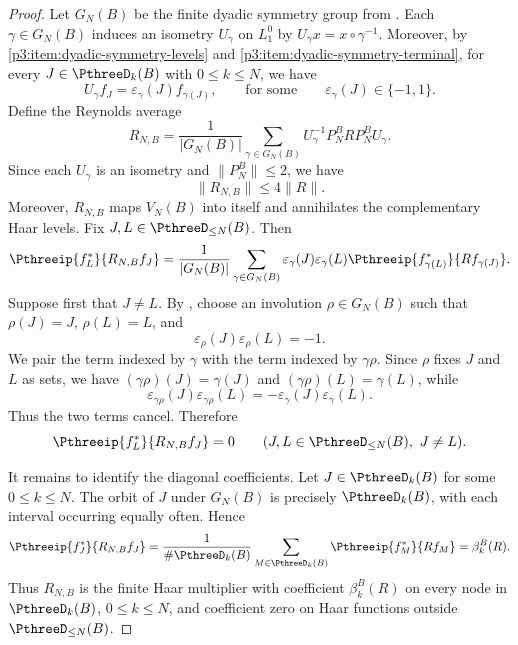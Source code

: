 \documentclass[11pt,reqno]{amsart}
\makeatletter
\theoremstyle{plain}
\theoremstyle{definition}
\newcounter{problempaper}
\newenvironment{problempaperbody}{%
  \setcounter{subsection}{0}%
  \setcounter{subsubsection}{0}%
  \setcounter{paragraph}{0}%
  \renewcommand{\thesubsection}{\arabic{subsection}}%
  \renewcommand{\thesubsubsection}{\thesubsection.\arabic{subsubsection}}%
  \renewcommand{\theparagraph}{\thesubsubsection.\arabic{paragraph}}%
  \let\problem@outersection\section
  \let\problem@outersubsection\subsection
  \let\problem@outersubsubsection\subsubsection
  \let\problem@outerparagraph\paragraph
  \let\section\problem@papersection
  \let\subsection\problem@papersubsection
  \let\subsubsection\problem@papersubsubsection
}{%
  \let\section\problem@outersection
  \let\subsection\problem@outersubsection
  \let\subsubsection\problem@outersubsubsection
  \let\paragraph\problem@outerparagraph
}
\newcommand{\problem@target}[2]{%
  \hypertarget{problem-\theproblempaper-#1-#2}{}%
}
\newcommand{\problem@paperheading}[3]{%
  \par\bigskip
  \problem@target{#1}{#2}%
  \noindent{\large\bfseries #2.\quad #3\par}%
  \nobreak\smallskip
}
\newcommand{\problem@papersubheading}[3]{%
  \par\medskip
  \problem@target{#1}{#2}%
  \noindent{\normalsize\bfseries #2.\quad #3\par}%
  \nobreak\smallskip
}
\newcommand{\problem@papersubsubheading}[3]{%
  \par\smallskip
  \problem@target{#1}{#2}%
  \noindent{\normalsize\itshape #2.\quad #3.\ }%
}
\def\problem@papersection{%
  \@ifstar{\problem@papersectionstar}{\problem@papersectionnostar}%
}
\def\problem@papersectionstar#1{%
  \par\bigskip\noindent{\large\bfseries #1\par}\nobreak\smallskip
}
\def\problem@papersectionnostar#1{%
  \refstepcounter{subsection}%
  \setcounter{subsubsection}{0}%
  \setcounter{paragraph}{0}%
  \problem@paperheading{section}{\thesubsection}{#1}%
  \problem@writecontentsline{section}{\thesubsection}{#1}%
}
\def\problem@papersubsection{%
  \@ifstar{\problem@papersubsectionstar}{\problem@papersubsectionnostar}%
}
\def\problem@papersubsectionstar#1{%
  \par\medskip\noindent{\normalsize\bfseries #1\par}\nobreak\smallskip
}
\def\problem@papersubsectionnostar#1{%
  \refstepcounter{subsubsection}%
  \setcounter{paragraph}{0}%
  \problem@papersubheading{subsection}{\thesubsubsection}{#1}%
  \problem@writecontentsline{subsection}{\thesubsubsection}{#1}%
}
\def\problem@papersubsubsection{%
  \@ifstar{\problem@papersubsubsectionstar}{\problem@papersubsubsectionnostar}%
}
\def\problem@papersubsubsectionstar#1{%
  \par\smallskip\noindent{\normalsize\itshape #1.\ }%
}
\def\problem@papersubsubsectionnostar#1{%
  \refstepcounter{paragraph}%
  \problem@papersubsubheading{subsubsection}{\theparagraph}{#1}%
  \problem@writecontentsline{subsubsection}{\theparagraph}{#1}%
}
\newcommand{\problem@writecontentsline}[3]{%
  \begingroup
  \protected@write\@auxout{}{%
    \string\problemcontentsentry{\theproblempaper}{#1}{#2}{#3}{\thepage}%
  }%
  \endgroup
}
\newcommand{\problemcontentsentry}[5]{%
  \@ifundefined{problemcontents@#1}{%
    \expandafter\gdef\csname problemcontents@#1\endcsname{}%
  }{}%
  \expandafter\g@addto@macro\csname problemcontents@#1\endcsname{%
    \problemcontentsline{#1}{#2}{#3}{#4}{#5}%
  }%
}
\newcommand{\problemcontentslink}[4]{%
  \hyperlink{problem-#1-#2-#3}{#4}%
}
\newcommand{\problemcontentsline}[5]{%
  \ifstrequal{#2}{section}{%
    \par\noindent
    \problemcontentslink{#1}{#2}{#3}{\makebox[2.5em][l]{#3}#4}%
    \nobreak\dotfill
    \problemcontentslink{#1}{#2}{#3}{#5}\par
  }{%
    \ifstrequal{#2}{subsection}{%
      \par\noindent\hspace*{1.5em}%
      \problemcontentslink{#1}{#2}{#3}{\makebox[3.5em][l]{#3}#4}%
      \nobreak\dotfill
      \problemcontentslink{#1}{#2}{#3}{#5}\par
    }{%
      \par\noindent\hspace*{3em}%
      \problemcontentslink{#1}{#2}{#3}{\makebox[4.5em][l]{#3}#4}%
      \nobreak\dotfill
      \problemcontentslink{#1}{#2}{#3}{#5}\par
    }%
  }%
}
\makeatother
\begin{document}
\begin{problempaperbody}
\begin{proof}
Let $G_N(B)$ be the finite dyadic symmetry group from . Each $\gamma\in G_N(B)$ induces an isometry $U_\gamma$ on $L_1^0$ by $U_\gamma x=x\circ\gamma^{-1}$. Moreover, by \ref{p3:item:dyadic-symmetry-levels} and \ref{p3:item:dyadic-symmetry-terminal}, for every $J\in\PthreeD_k(B)$ with $0\leq k\leq N$, we have
\begin{equation*}
        U_\gamma f_J=\varepsilon_\gamma(J)f_{\gamma(J)}, \qquad \text{for some} \qquad \varepsilon_\gamma(J)\in\{-1,1\}.
\end{equation*}
Define the Reynolds average
\begin{equation*}
        R_{N,B}=\frac1{|G_N(B)|}\sum_{\gamma\in G_N(B)}U_\gamma^{-1}P_N^BRP_N^BU_\gamma .
\end{equation*}
Since each $U_\gamma$ is an isometry and $\|P_N^B\|\leq 2$, we have
\begin{equation*}
        \|R_{N,B}\|\leq 4\|R\|.
\end{equation*}
Moreover, $R_{N,B}$ maps $V_N(B)$ into itself and annihilates the complementary Haar levels. Fix $J,L\in\PthreeD_{\leq N}(B)$. Then
\begin{equation*}
        \Pthreeip{f_L^*}{R_{N,B}f_J}=\frac1{|G_N(B)|}\sum_{\gamma\in G_N(B)}\varepsilon_\gamma(J)\varepsilon_\gamma(L)\Pthreeip{f_{\gamma(L)}^*}{Rf_{\gamma(J)}}.
\end{equation*}
Suppose first that $J\ne L$. By , choose an involution $\rho\in G_N(B)$ such that $\rho(J)=J$, $\rho(L)=L$, and
\begin{equation*}
        \varepsilon_\rho(J)\varepsilon_\rho(L)=-1.
\end{equation*}
We pair the term indexed by $\gamma$ with the term indexed by $\gamma\rho$. Since $\rho$ fixes $J$ and $L$ as sets, we have $(\gamma\rho)(J)=\gamma(J)$ and $(\gamma\rho)(L)=\gamma(L)$, while
\begin{equation*}
        \varepsilon_{\gamma\rho}(J)\varepsilon_{\gamma\rho}(L)=-\varepsilon_\gamma(J)\varepsilon_\gamma(L).
\end{equation*}
Thus the two terms cancel. Therefore
\begin{equation*}
        \Pthreeip{f_L^*}{R_{N,B}f_J}=0\qquad (J,L\in\PthreeD_{\leq N}(B),\ J\ne L).
\end{equation*}

It remains to identify the diagonal coefficients. Let $J\in\PthreeD_k(B)$ for some $0\leq k\leq N$. The orbit of $J$ under $G_N(B)$ is precisely $\PthreeD_k(B)$, with each interval occurring equally often. Hence
\begin{equation*}
        \Pthreeip{f_J^*}{R_{N,B}f_J}=\frac1{\#\PthreeD_k(B)}\sum_{M\in\PthreeD_k(B)}\Pthreeip{f_M^*}{Rf_M}=\beta_k^B(R).
\end{equation*}
Thus $R_{N,B}$ is the finite Haar multiplier with coefficient $\beta_k^B(R)$ on every node in $\PthreeD_k(B)$, $0\leq k\leq N$, and coefficient zero on Haar functions outside $\PthreeD_{\leq N}(B)$.



\end{proof}
\end{problempaperbody}
\end{document}
